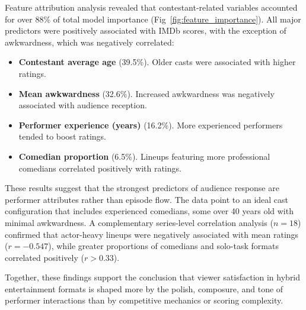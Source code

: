 \documentclass[10pt,letterpaper]{article}
\begin{document}
Feature attribution analysis revealed that contestant-related variables accounted for over 88\% of total model importance (Fig~\ref{fig:feature_importance}). All major predictors were positively associated with IMDb scores, with the exception of awkwardness, which was negatively correlated:
\begin{itemize}
  \item \textbf{Contestant average age} (39.5\%). Older casts were associated with higher ratings.
  \item \textbf{Mean awkwardness} (32.6\%). Increased awkwardness was negatively associated with audience reception.
  \item \textbf{Performer experience (years)} (16.2\%). More experienced performers tended to boost ratings.
  \item \textbf{Comedian proportion} (6.5\%). Lineups featuring more professional comedians correlated positively with ratings.
\end{itemize}

These results suggest that the strongest predictors of audience response are performer attributes rather than episode flow. The data point to an ideal cast configuration that includes experienced comedians, some over 40 years old with minimal awkwardness. A complementary series-level correlation analysis ($n = 18$) confirmed that actor-heavy lineups were negatively associated with mean ratings ($r = -0.547$), while greater proportions of comedians and solo-task formats correlated positively ($r > 0.33$).

Together, these findings support the conclusion that viewer satisfaction in hybrid entertainment formats is shaped more by the polish, composure, and tone of performer interactions than by competitive mechanics or scoring complexity.
\end{document}
